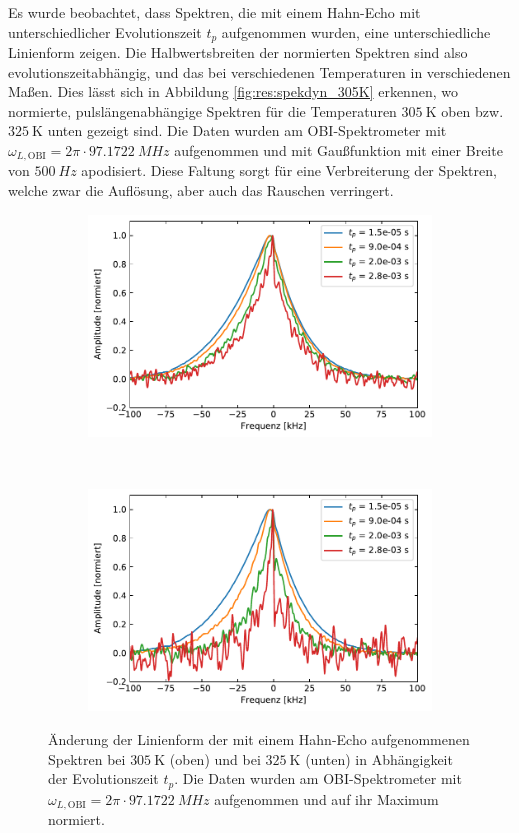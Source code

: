 Es wurde beobachtet, dass Spektren, die mit einem Hahn-Echo mit unterschiedlicher Evolutionszeit $t_p$ aufgenommen wurden, eine unterschiedliche Linienform zeigen. Die Halbwertsbreiten der normierten Spektren sind also evolutionszeitabhängig, und das bei verschiedenen Temperaturen in verschiedenen Maßen. Dies lässt sich in Abbildung \ref{fig:res:spekdyn_305K} erkennen, wo normierte, pulslängenabhängige Spektren für die Temperaturen $\SI{305}{\kelvin}$ oben bzw. $\SI{325}{\kelvin}$ unten gezeigt sind. Die Daten wurden am OBI-Spektrometer mit $\omega_{L, \text{OBI}} = 2\pi \cdot \SI{97.1722}{MHz}$ aufgenommen und mit Gaußfunktion mit einer Breite von $\SI{500}{Hz}$ apodisiert. Diese Faltung sorgt für eine Verbreiterung der Spektren, welche zwar die Auflösung, aber auch das Rauschen verringert.
\begin{figure}
	\centering
	\begin{subfigure}{\textwidth}
		\centering
		\includegraphics[width=.9\textwidth]{graphics/plot/spekdyn_305K2.pdf}
	\end{subfigure} \\
	\begin{subfigure}{\textwidth}
		\centering
		\includegraphics[width=.9\textwidth]{graphics/plot/spekdyn_325K2.pdf}
	\end{subfigure}
	\caption{Änderung der Linienform der mit einem Hahn-Echo aufgenommenen Spektren bei $\SI{305}{\kelvin}$ (oben) und bei $\SI{325}{\kelvin}$ (unten) in Abhängigkeit der Evolutionszeit $t_p$. Die Daten wurden am OBI-Spektrometer mit $\omega_{L, \text{OBI}} = 2\pi \cdot \SI{97.1722}{MHz}$ aufgenommen und auf ihr Maximum normiert.}
	\label{fig:res:spekdyn_305K}
	\label{fig:res:spekdyn_325K}
\end{figure}

